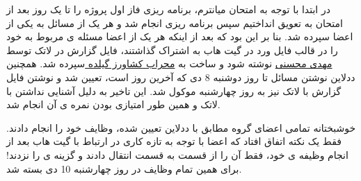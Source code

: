 \documentclass[12pt,a4paper]{article}
\begin{document}
در ابتدا با توجه به امتحان میانترم، برنامه ریزی فاز اول پروژه را تا یک روز بعد از امتحان به تعویق انداختیم سپس برنامه ریزی انجام شد و هر یک از مسائل به یکی از اعضا سپرده شد. بنا بر این بود که بعد از اینکه هر یک از اعضا مسئله ی مربوط به خود را در قالب فایل ورد در گیت هاب به اشتراک گذاشتند، فایل گزارش در لاتک توسط \underline{مهدی محسنی} نوشته شود و ساخت  به \underline{محراب کشاورز گیلده }سپرده شد. همچنین ددلاین نوشتن مسائل تا روز دوشنبه 8 دی که آخرین روز  است، تعیین شد و نوشتن فایل گزارش با لاتک نیز به روز چهارشنبه موکول شد. این تاخیر به دلیل آشنایی نداشتن با لاتک و همین طور امتیازی بودن نمره ی آن انجام شد.

خوشبختانه تمامی اعضای گروه مطابق با ددلاین تعیین شده، وظایف خود را انجام دادند. فقط یک نکته اتفاق افتاد که اعضا با توجه به تازه کاری در ارتباط با گیت هاب بعد از انجام وظیفه ی خود، فقط آن را از قسمت  به قسمت  انتقال دادند و گزینه ی  را نزدند! برای همین تمام وظایف در روز چهارشنبه 10 دی بسته شد.
\end{document}
